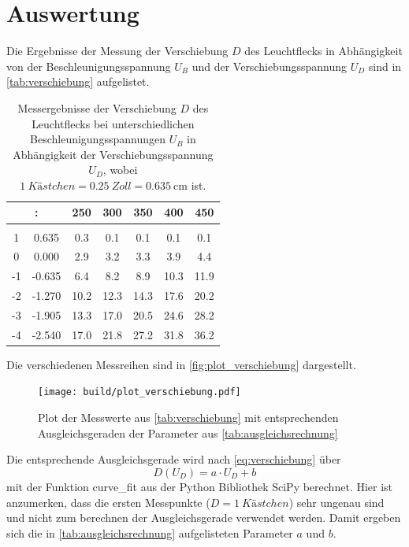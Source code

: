 \section{Auswertung}
\label{sec:Auswertung}

Die Ergebnisse der Messung der Verschiebung $D$ des Leuchtflecks in Abhängigkeit von der Beschleunigungsspannung $U_B$ und der Verschiebungsspannung $U_D$ sind in \autoref{tab:verschiebung} aufgelistet.

\begin{table}
    \centering
    \caption{Messergebnisse der Verschiebung $D$ des Leuchtflecks bei unterschiedlichen Beschleunigungsspannungen $U_B$ in Abhängigkeit der Verschiebungsspannung $U_D$, wobei $\SI{1}{Kästchen}=\SI{0.25}{Zoll}=\SI{0.635}{\centi\metre}$ ist.}
    \begin{tabular}{S S S S S S S}
        \toprule
         & {250} & {300} & {350} & {400} & {450} \\
        \midrule
         &  &  \\
         & 0.635 & 0.3 & 0.1 & 0.1 & 0.1 & 0.1 \\
        0 & 0.000 & 2.9 & 3.2 & 3.3 & 3.9 & 4.4 \\
        -1 & -0.635 & 6.4 & 8.2 & 8.9 & 10.3 & 11.9 \\
        -2 & -1.270 & 10.2 & 12.3 & 14.3 & 17.6 & 20.2 \\
        -3 & -1.905 & 13.3 & 17.0 & 20.5 & 24.6 & 28.2 \\
        -4 & -2.540 & 17.0 & 21.8 & 27.2 & 31.8 & 36.2 \\
        \bottomrule
    \end{tabular}
    \label{tab:verschiebung}
\end{table}

Die verschiedenen Messreihen sind in \autoref{fig:plot_verschiebung} dargestellt. 

\begin{figure}
    \centering
    \texttt{[image: build/plot\_verschiebung.pdf]}
    \caption{Plot der Messwerte aus \autoref{tab:verschiebung} mit entsprechenden Ausgleichsgeraden der Parameter aus \autoref{tab:ausgleichsrechnung}}
    \label{fig:plot_verschiebung}
\end{figure}

Die entsprechende Ausgleichsgerade wird nach \autoref{eq:verschiebung} über
\begin{equation}
    D(U_D) = a \cdot U_D + b
\end{equation}
mit der Funktion curve\_fit aus der Python Bibliothek SciPy berechnet.
Hier ist anzumerken, dass die ersten Messpunkte ($D=\SI{1}{Kästchen}$) sehr ungenau sind und nicht zum berechnen der Ausgleichsgerade verwendet werden.
Damit ergeben sich die in \autoref{tab:ausgleichsrechnung} aufgelisteten Parameter $a$ und $b$.

